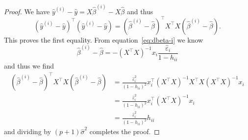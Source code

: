 \documentclass[
  a4paper,
]{article}
\theoremstyle{definition}
\theoremstyle{definition}
\theoremstyle{definition}
\theoremstyle{definition}
\theoremstyle{remark}
\begin{document}
\begin{proof}
We have \(\hat y^{(i)} - \hat y = X \hat\beta^{(i)} - X \hat\beta\) and thus
\begin{equation*}
  (\hat y^{(i)} - \hat y)^\top (\hat y^{(i)} - \hat y)
  = (\hat\beta^{(i)} - \hat\beta)^\top X^\top X (\hat\beta^{(i)} - \hat\beta).
\end{equation*}
This proves the first equality. From equation~\eqref{eq:dbeta-i} we know
\begin{equation*}
  \hat\beta^{(i)} - \hat\beta
    = - (X^\top X)^{-1} x_i \frac{\hat\varepsilon_i}{1 - h_{ii}}
\end{equation*}
and thus we find
\begin{align*}
  (\hat\beta^{(i)} - \hat\beta)^\top X^\top X (\hat\beta^{(i)} - \hat\beta)
  &= \frac{\hat\varepsilon_i^2}{(1 - h_{ii})^2} x_i^\top (X^\top X)^{-1} X^\top X (X^\top X)^{-1} x_i \\
  &= \frac{\hat\varepsilon_i^2}{(1 - h_{ii})^2} x_i^\top (X^\top X)^{-1} x_i \\
  &= \frac{\hat\varepsilon_i^2}{(1 - h_{ii})^2} h_{ii}
\end{align*}
and dividing by \((p+1)\hat\sigma^2\) completes the proof.
\end{proof}
\end{document}
